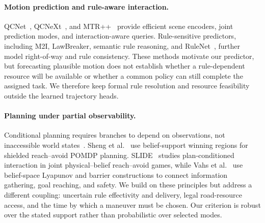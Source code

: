 \documentclass[letterpaper]{article} %
\begin{document}
\paragraph{Motion prediction and rule-aware interaction.}
QCNet~\citep{zhou2023query}, QCNeXt~\citep{zhou2023qcnext}, and MTR++~\citep{shi2024mtr++} provide efficient scene encoders, joint prediction modes, and interaction-aware queries. Rule-sensitive predictors, including M2I, LawBreaker, semantic rule reasoning, and RuleNet~\citep{sun2022m2i,sun2022lawbreaker,liu2023semantic,shi2025rulenet}, further model right-of-way and rule consistency. These methods motivate our predictor, but forecasting plausible motion does not establish whether a rule-dependent resource will be available or whether a common policy can still complete the assigned task. We therefore keep formal rule resolution and resource feasibility outside the learned trajectory heads.

\paragraph{Planning under partial observability.}
Conditional planning requires branches to depend on observations, not inaccessible world states~\citep{kaelbling1998planning,rintanen2005conditional}. Sheng et al.~\citep{sheng2024safe} use belief-support winning regions for shielded reach--avoid POMDP planning. SLIDE~\citep{pandya2025robots} studies plan-conditioned interaction in joint physical--belief reach--avoid games, while Vahs et al.~\citep{vahs2026safety} use belief-space Lyapunov and barrier constructions to connect information gathering, goal reaching, and safety. We build on these principles but address a different coupling: uncertain rule effectivity and delivery, legal road-resource access, and the time by which a maneuver must be chosen. Our criterion is robust over the stated support rather than probabilistic over selected modes.
\end{document}
